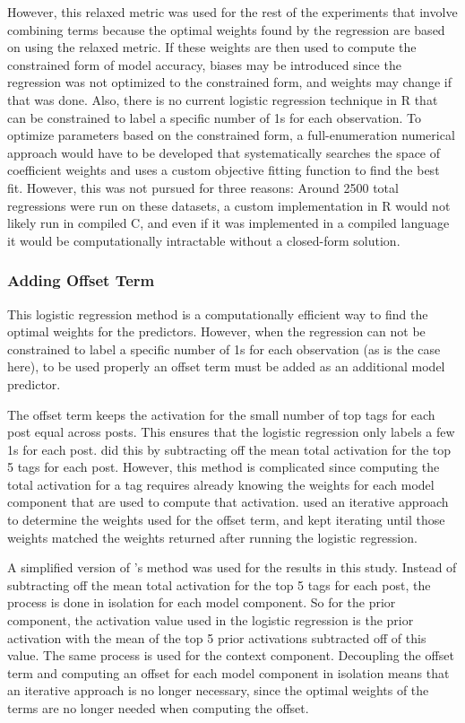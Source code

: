 \documentclass[man,floatsintext,donotrepeattitle]{apa6}
\begin{document}
However, this relaxed metric was used for the rest of the experiments that involve combining terms because the optimal weights found by the regression are based on using the relaxed metric.
If these weights are then used to compute the constrained form of model accuracy, biases may be introduced since the regression was not optimized to the constrained form, and weights may change if that was done.
Also, there is no current logistic regression technique in R that can be constrained to label a specific number of 1s for each observation. 
To optimize parameters based on the constrained form,
a full-enumeration numerical approach would have to be developed that systematically searches the space of coefficient weights and uses a custom objective fitting function to find the best fit.
However, this was not pursued for three reasons:
Around \num{2500} total regressions were run on these datasets,
a custom implementation in R would not likely run in compiled C,
and even if it was implemented in a compiled language it would be computationally intractable without a closed-form solution.

\subsubsection{Adding Offset Term}

This logistic regression method is a computationally efficient way to find the optimal weights for the predictors.
However, when the regression can not be constrained to label a specific number of 1s for each observation (as is the case here), to be used properly an offset term must be added as an additional model predictor.

The offset term keeps the activation for the small number of top tags for each post equal across posts.
This ensures that the logistic regression only labels a few 1s for each post.
\textcite{Stanley2013} did this by subtracting off the mean total activation for the top 5 tags for each post.
However, this method is complicated since computing the total activation for a tag requires already knowing the weights for each model component that are used to compute that activation.
\citeauthor{Stanley2013} used an iterative approach to determine the weights used for the offset term, and kept iterating until those weights matched the weights returned after running the logistic regression.

A simplified version of \citeauthor{Stanley2013}'s method was used for the results in this study.
Instead of subtracting off the mean total activation for the top 5 tags for each post, the process is done in isolation for each model component.
So for the prior component, the activation value used in the logistic regression is the prior activation with the mean of the top 5 prior activations subtracted off of this value.
The same process is used for the context component.
Decoupling the offset term and computing an offset for each model component in isolation means that an iterative approach is no longer necessary,
since the optimal weights of the terms are no longer needed when computing the offset.
\end{document}
